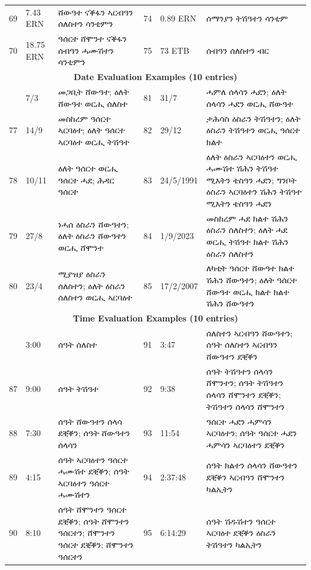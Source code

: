 \documentclass{article}
\newcommand{\ti}[1]{{\geezfont #1}}
\begin{document}
\begin{longtable}{@{\hspace{1pt}}llp{5.65cm}|llp{5.65cm}@{\hspace{1pt}}}
69 & 7.43 ERN & \ti{ሸውዓተ ናቕፋን ኣርብዓን ሰለስተን ሳንቲምን} & 74 & 0.89 ERN & \ti{ሰማንያን ትሽዓተን ሳንቲም} \\
70 & 18.75 ERN & \ti{ዓሰርተ ሸሞንተ ናቕፋን ሰብዓን ሓሙሽተን ሳንቲምን} & 75 & 73 ETB & \ti{ሰብዓን ሰለስተን ብር} \\
\midrule
\multicolumn{6}{c}{\textbf{Date Evaluation Examples (10 entries)}} \\
\addlinespace
76 & 7/3 & \ti{መጋቢት ሸውዓተ; ዕለት ሸውዓተ ወርሒ ሰለስተ} & 81 & 31/7 & \ti{ሓምለ ሰላሳን ሓደን; ዕለት ሰላሳን ሓደን ወርሒ ሸውዓተ} \\
77 & 14/9 & \ti{መስከረም ዓሰርተ ኣርባዕተ; \newline ዕለት ዓሰርተ ኣርባዕተ ወርሒ ትሽዓተ} & 82 & 29/12 & \ti{ታሕሳስ ዕስራን ትሽዓተን; \newline ዕለት ዕስራን ትሽዓተን ወርሒ ዓሰርተ ክልተ} \\
78 & 10/11 & \ti{ዕለት ዓሰርተ ወርሒ ዓሰርተ ሓደ; \newline ሕዳር ዓሰርተ} & 83 & 24/5/1991 & \ti{ዕለት ዕስራን ኣርባዕተን ወርሒ ሓሙሽተ ሽሕን ትሽዓተ ሚእትን ቴስዓን ሓደን; ግንቦት ዕስራን ኣርባዕተን ሽሕን ትሽዓተ ሚእትን ቴስዓን ሓደን} \\
79 & 27/8 & \ti{ነሓሰ ዕስራን ሸውዓተን; \newline ዕለት ዕስራን ሸውዓተን ወርሒ ሸሞንተ} & 84 & 1/9/2023 & \ti{መስከረም ሓደ ክልተ ሽሕን ዕስራን ሰለስተን; ዕለት ሓደ ወርሒ ትሽዓተ ክልተ ሽሕን ዕስራን ሰለስተን} \\
80 & 23/4 & \ti{ሚያዝያ ዕስራን ሰለስተን; \newline ዕለት ዕስራን ሰለስተን ወርሒ ኣርባዕተ} & 85 & 17/2/2007 & \ti{ለካቲት ዓሰርተ ሸውዓተ ክልተ ሽሕን ሸውዓተን; ዕለት ዓሰርተ ሸውዓተ ወርሒ ክልተ ክልተ ሽሕን ሸውዓተን} \\
\midrule
\multicolumn{6}{c}{\textbf{Time Evaluation Examples (10 entries)}} \\
\addlinespace
86 & 3:00 & \ti{ሰዓት ሰለስተ} & 91 & 3:47 & \ti{ሰለስተን ኣርብዓን ሸውዓተን; \newline ሰዓት ሰለስተን ኣርብዓን ሸውዓተን ደቒቕን} \\
87 & 9:00 & \ti{ሰዓት ትሽዓተ} & 92 & 9:38 & \ti{ሰዓት ትሽዓተን ሰላሳን ሸሞንተን; ሰዓት ትሽዓተን ሰላሳን ሸሞንተን ደቒቕን; ትሽዓተን ሰላሳን ሸሞንተን} \\
88 & 7:30 & \ti{ሰዓት ሸውዓተን ሰላሳ ደቒቕን; \newline ሰዓት ሸውዓተን ሰላሳን} & 93 & 11:54 & \ti{ዓሰርተ ሓደን ሓምሳን ኣርባዕተን; \newline ሰዓት ዓሰርተ ሓደን ሓምሳን ኣርባዕተን ደቒቕን} \\
89 & 4:15 & \ti{ሰዓት ኣርባዕተን ዓሰርተ ሓሙሽተ ደቒቕን; \newline ሰዓት ኣርባዕተን ዓሰርተ ሓሙሽተን} & 94 & 2:37:48 & \ti{ሰዓት ክልተን ሰላሳን ሸውዓተን ደቒቕን ኣርብዓን ሸሞንተን ካልኢትን} \\
90 & 8:10 & \ti{ሰዓት ሸሞንተን ዓሰርተ ደቒቕን; ሰዓት ሸሞንተን ዓሰርተን; ሸሞንተን ዓሰርተ ደቒቕን; ሸሞንተን ዓሰርተን} & 95 & 6:14:29 & \ti{ሰዓት ሽዱሽተን ዓሰርተ ኣርባዕተ ደቒቕን ዕስራን ትሽዓተን ካልኢትን} \\

\end{longtable}
\end{document}
